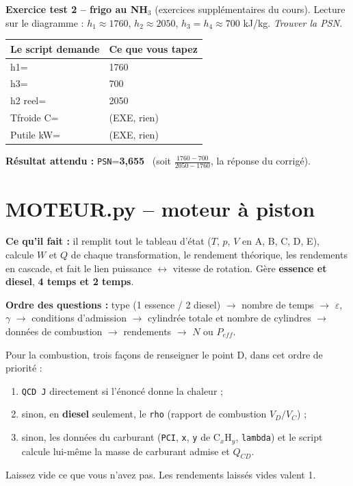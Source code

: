 \documentclass[10.5pt,a4paper]{article}
\makeatletter
\newenvironment{saisie}{%
\begin{center}\small
\begin{tabular}{@{}>{\ttfamily}l l@{}}
\toprule
\textrm{\textbf{Le script demande}} & \textbf{Ce que vous tapez} \\
\midrule
}{%
\bottomrule
\end{tabular}
\end{center}
}
\makeatother
\begin{document}
\begin{test}
\textbf{Exercice test 2 -- frigo au NH$_3$} (exercices supplémentaires du cours). Lecture sur le
diagramme : $h_1\approx1760$, $h_2\approx2050$, $h_3=h_4\approx700$ kJ/kg. \emph{Trouver la PSN.}

\begin{saisie}
h1= & 1760 \\
h3= & 700 \\
h2 reel= & 2050 \\
Tfroide C= & \textrm{(EXE, rien)} \\
Putile kW= & \textrm{(EXE, rien)} \\
\end{saisie}

\textbf{Résultat attendu :} \texttt{PSN}=\textbf{3,655} \ (soit $\frac{1760-700}{2050-1760}$, la réponse
du corrigé).
\end{test}

\newpage
\section{MOTEUR.py -- moteur à piston}

\begin{objectif}
\textbf{Ce qu'il fait :} il remplit tout le tableau d'état ($T$, $p$, $V$ en A, B, C, D, E), calcule
$W$ et $Q$ de chaque transformation, le rendement théorique, les rendements en cascade, et fait le lien
puissance $\leftrightarrow$ vitesse de rotation. Gère \textbf{essence et diesel}, \textbf{4 temps et 2
temps}.
\end{objectif}

\textbf{Ordre des questions :} type (1 essence / 2 diesel) $\rightarrow$ nombre de temps $\rightarrow$
$\varepsilon$, $\gamma$ $\rightarrow$ conditions d'admission $\rightarrow$ cylindrée totale et nombre de
cylindres $\rightarrow$ données de combustion $\rightarrow$ rendements $\rightarrow$ $N$ ou $P_{eff}$.

\begin{piege}
Pour la combustion, trois façons de renseigner le point D, dans cet ordre de priorité :
\begin{enumerate}[leftmargin=1.4em,nosep]
\item \texttt{QCD J} directement si l'énoncé donne la chaleur ;
\item sinon, en \textbf{diesel} seulement, le \texttt{rho} (rapport de combustion $V_D/V_C$) ;
\item sinon, les données du carburant (\texttt{PCI}, \texttt{x}, \texttt{y} de C$_x$H$_y$,
\texttt{lambda}) et le script calcule lui-même la masse de carburant admise et $Q_{CD}$.
\end{enumerate}
Laissez vide ce que vous n'avez pas. Les rendements laissés vides valent 1.
\end{piege}
\end{document}
